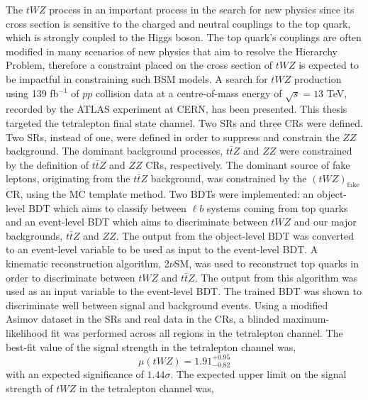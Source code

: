 

The $tWZ$ process in an important process in the search for new physics since its cross section is sensitive to the charged and neutral couplings to the top quark, which is strongly coupled to the Higgs boson. The top quark's couplings are often modified in many scenarios of new physics that aim to resolve the Hierarchy Problem, therefore a constraint placed on the cross section of $tWZ$ is expected to be impactful in constraining such BSM models. A search for $tWZ$ production using 139 fb$^{-1}$ of $pp$ collision data at a centre-of-mass energy of $\sqrt{s} = 13$ TeV, recorded by the ATLAS experiment at CERN, has been presented. This thesis targeted the tetralepton final state channel. Two SRs and three CRs were defined. Two SRs, instead of one, were defined in order to suppress and constrain the $ZZ$ background. The dominant background processes, $t\bar{t}Z $ and $ZZ$ were constrained by the definition of $t\bar{t}Z$ and $ZZ$ CRs, respectively. The dominant source of fake leptons, originating from the $t\bar{t}Z$ background, was constrained by the $(tWZ)_{\text{fake}}$ CR, using the MC template method. Two BDTs were implemented: an object-level BDT which aims to classify between $\ell b$ systems coming from top quarks and an event-level BDT which aims to discriminate between $tWZ$ and our major backgrounds, $t\bar{t}Z$ and $ZZ$. The output from the object-level BDT was converted to an event-level variable to be used as input to the event-level BDT. A kinematic reconstruction algorithm, 2$\nu$SM, was used to reconstruct top quarks in order to discriminate between $tWZ$ and $t\bar{t}Z$. The output from this algorithm was used as an input variable to the event-level BDT. The trained BDT was shown to discriminate well between signal and background events. Using a modified Asimov dataset in the SRs and real data in the CRs, a blinded maximum-likelihood fit was performed across all regions in the tetralepton channel. The best-fit value of the signal strength in the tetralepton channel was,
\begin{equation}
  \mu (tWZ) =   1.91^{+0.95}_{-0.82}
\end{equation}
with an expected significance of $1.44\sigma$. The expected upper limit on the signal strength of $tWZ$ in the tetralepton channel was,

